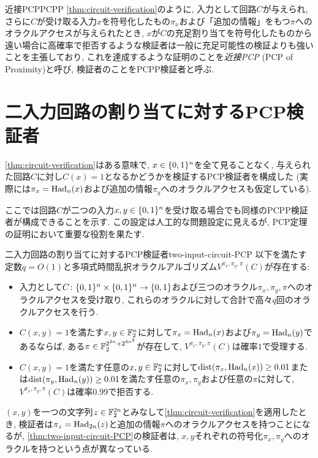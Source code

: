 \begin{remark}{近接PCP}{PCPP}
  \cref{thm:circuit-verification}のように, 入力として回路$C$が与えられ, さらに$C$が受け取る入力$x$を符号化したもの$\pi_x$および「追加の情報」をもつ$\pi$へのオラクルアクセスが与えられたとき, $x$が$C$の充足割り当てを符号化したものから遠い場合に高確率で拒否するような検証者は一般に充足可能性の検証よりも強いことを主張しており, これを達成するような証明のことを\emph{近接PCP} (PCP of Proximity)と呼び, 検証者のことをPCPP検証者と呼ぶ.
\end{remark}

\section{二入力回路の割り当てに対するPCP検証者}
\cref{thm:circuit-verification}はある意味で, $x\in\{0,1\}^n$を全て見ることなく, 与えられた回路$C$に対し$C(x)=1$となるかどうかを検証するPCP検証者を構成した (実際には$\pi_x=\mathrm{Had}_n(x)$および追加の情報$\pi_y$へのオラクルアクセスも仮定している).

ここでは回路$C$が二つの入力$x,y\in\{0,1\}^n$を受け取る場合でも同様のPCPP検証者が構成できることを示す.
この設定は人工的な問題設定に見えるが, PCP定理の証明において重要な役割を果たす.


\begin{theorem}{二入力回路の割り当てに対するPCP検証者}{two-input-circuit-PCP}
  以下を満たす定数$q=O(1)$と多項式時間乱択オラクルアルゴリズム$V^{\pi_x,\pi_y,\pi}(C)$が存在する:
  \begin{itemize}
    \item 入力として$C\colon\{0,1\}^n\times\{0,1\}^n\to\{0,1\}$および三つのオラクル$\pi_x,\pi_y, \pi$へのオラクルアクセスを受け取り, これらのオラクルに対して合計で高々$q$回のオラクルアクセスを行う.
    \item $C(x,y)=1$を満たす$x,y\in\mathbb{F}_2^n$に対して$\pi_x=\mathrm{Had}_n(x)$および$\pi_y=\mathrm{Had}_n(y)$であるならば, ある$\pi\in \mathbb{F}_2^{2^{2n} + 2^{4n^2}}$が存在して, $V^{\pi_x,\pi_y,\pi}(C)$は確率$1$で受理する.
    \item $C(x,y)=1$を満たす任意の$x,y\in\mathbb{F}_2^n$に対して$\mathrm{dist}(\pi_x,\mathrm{Had}_n(x))\ge0.01$または$\mathrm{dist}(\pi_y,\mathrm{Had}_n(y))\ge0.01$を満たす任意の$\pi_x,\pi_y$および任意の$\pi$に対して, $V^{\pi_x,\pi_y,\pi}(C)$は確率$0.99$で拒否する.
  \end{itemize}
\end{theorem}

$(x,y)$を一つの文字列$z\in\mathbb{F}_2^{2n}$とみなして\cref{thm:circuit-verification}を適用したとき, 検証者は$\pi_z=\mathrm{Had}_{2n}(z)$と追加の情報$\pi$へのオラクルアクセスを持つことになるが,
\cref{thm:two-input-circuit-PCP}の検証者は, $x,y$それぞれの符号化$\pi_x,\pi_y$へのオラクルを持つという点が異なっている.

